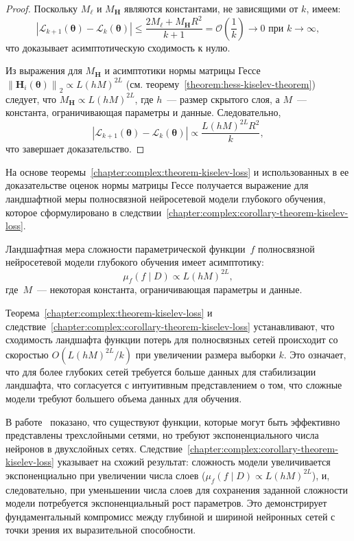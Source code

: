 \begin{proof}
    Поскольку $M_{\ell}$ и $M_{\mathbf{H}}$ являются константами, не зависящими от $k$, имеем:
    \[
        \left| \mathcal{L}_{k+1}(\boldsymbol{\theta}) - \mathcal{L}_k(\boldsymbol{\theta}) \right| \leqslant \frac{2M_{\ell} + M_{\mathbf{H}}R^2}{k+1} = \mathcal{O}\left(\frac{1}{k}\right) \to 0 \text{ при } k \to \infty,
    \]
    что доказывает асимптотическую сходимость к нулю.

    Из выражения для $M_{\mathbf{H}}$ и асимптотики нормы матрицы Гессе $\left\| \mathbf{H}_{i}(\boldsymbol{\theta}) \right\|_2 \propto L (hM)^{2L}$ (см. теорему~\ref{theorem:hess-kiselev-theorem}) следует, что $M_{\mathbf{H}} \propto L (hM)^{2L}$, где $h$~--- размер скрытого слоя, а $M$~--- константа, ограничивающая параметры и данные. Следовательно,
    \[
        \left| \mathcal{L}_{k+1}(\boldsymbol{\theta}) - \mathcal{L}_k(\boldsymbol{\theta}) \right| \propto \frac{L (hM)^{2L} R^2}{k},
    \]
    что завершает доказательство.
\end{proof}

На основе теоремы~\ref{chapter:complex:theorem-kiselev-loss} и использованных в ее доказательстве оценок нормы матрицы Гессе получается выражение для ландшафтной меры полносвязной нейросетевой модели глубокого обучения, которое сформулировано в следствии~\ref{chapter:complex:corollary-theorem-kiselev-loss}.

\begin{corollary}\label{chapter:complex:corollary-theorem-kiselev-loss}
    Ландшафтная мера сложности параметрической функции~$f$ полносвязной нейросетевой модели глубокого обучения имеет асимптотику:
    \[
        \mu_f(f\mid D) \propto L(hM)^{2L},
    \]
    где~$M$~--- некоторая константа, ограничивающая параметры и данные.
\end{corollary}

Теорема~\ref{chapter:complex:theorem-kiselev-loss} и следствие~\ref{chapter:complex:corollary-theorem-kiselev-loss} устанавливают, что сходимость ландшафта функции потерь для полносвязных сетей происходит со скоростью $O(L(hM)^{2L}/k)$ при увеличении размера выборки $k$. Это означает, что для более глубоких сетей требуется больше данных для стабилизации ландшафта, что согласуется с интуитивным представлением о том, что сложные модели требуют большего объема данных для обучения.

В работе~\cite{eldan2016exponentialcomplexity} показано, что существуют функции, которые могут быть эффективно представлены трехслойными сетями, но требуют экспоненциального числа нейронов в двухслойных сетях. Следствие~\ref{chapter:complex:corollary-theorem-kiselev-loss} указывает на схожий результат: сложность модели увеличивается экспоненциально при увеличении числа слоев ($\mu_f(f\mid D) \propto L(hM)^{2L}$), и, следовательно, при уменьшении числа слоев для сохранения заданной сложности модели потребуется экспоненциальный рост параметров. Это демонстрирует фундаментальный компромисс между глубиной и шириной нейронных сетей с точки зрения их выразительной способности.


